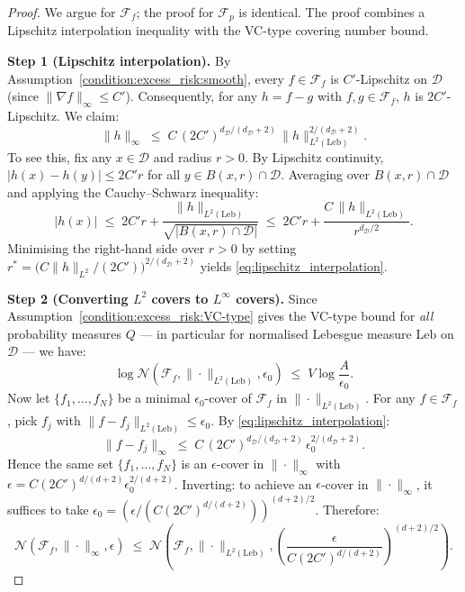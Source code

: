 \begin{proof}
We argue for $\mathcal{F}_f$; the proof for $\mathcal{F}_p$ is identical. The proof combines a Lipschitz interpolation inequality with the VC-type covering number bound.

\noindent\textbf{Step 1 (Lipschitz interpolation).}
By Assumption~\ref{condition:excess_risk:smooth}, every $f\in\mathcal{F}_f$ is $C'$-Lipschitz on $\mathcal{D}$ (since $\|\nabla f\|_\infty\leq C'$). Consequently, for any $h = f-g$ with $f,g\in\mathcal{F}_f$, $h$ is $2C'$-Lipschitz. We claim:
\begin{equation}\label{eq:lipschitz_interpolation}
\|h\|_\infty \;\leq\; C\,(2C')^{d_{\mathcal{D}}/(d_{\mathcal{D}}+2)}\,\|h\|_{L^2(\mathrm{Leb})}^{2/(d_{\mathcal{D}}+2)}.
\end{equation}
To see this, fix any $x\in\mathcal{D}$ and radius $r>0$. By Lipschitz continuity, $|h(x)-h(y)|\leq 2C' r$ for all $y\in B(x,r)\cap\mathcal{D}$. Averaging over $B(x,r)\cap\mathcal{D}$ and applying the Cauchy--Schwarz inequality:
\[
|h(x)| \;\leq\; 2C' r + \frac{\|h\|_{L^2(\mathrm{Leb})}}{\sqrt{|B(x,r)\cap\mathcal{D}|}}
\;\leq\; 2C' r + \frac{C\,\|h\|_{L^2(\mathrm{Leb})}}{r^{d_{\mathcal{D}}/2}}.
\]
Minimising the right-hand side over $r>0$ by setting $r^* = \bigl(C\|h\|_{L^2}/(2C')\bigr)^{2/(d_{\mathcal{D}}+2)}$ yields \eqref{eq:lipschitz_interpolation}.

\noindent\textbf{Step 2 (Converting $L^2$ covers to $L^\infty$ covers).}
Since Assumption~\ref{condition:excess_risk:VC-type} gives the VC-type bound for \emph{all} probability measures $Q$ — in particular for normalised Lebesgue measure $\mathrm{Leb}$ on $\mathcal{D}$ — we have:
\[
\log\mathcal{N}(\mathcal{F}_f,\|\cdot\|_{L^2(\mathrm{Leb})},\epsilon_0) \;\leq\; V\log\frac{A}{\epsilon_0}.
\]
Now let $\{f_1,\ldots,f_N\}$ be a minimal $\epsilon_0$-cover of $\mathcal{F}_f$ in $\|\cdot\|_{L^2(\mathrm{Leb})}$. For any $f\in\mathcal{F}_f$, pick $f_j$ with $\|f-f_j\|_{L^2(\mathrm{Leb})}\leq\epsilon_0$. By \eqref{eq:lipschitz_interpolation}:
\[
\|f-f_j\|_\infty \;\leq\; C\,(2C')^{d_{\mathcal{D}}/(d_{\mathcal{D}}+2)}\,\epsilon_0^{2/(d_{\mathcal{D}}+2)}.
\]
Hence the same set $\{f_1,\ldots,f_N\}$ is an $\epsilon$-cover in $\|\cdot\|_\infty$ with $\epsilon = C(2C')^{d/(d+2)}\epsilon_0^{2/(d+2)}$. Inverting: to achieve an $\epsilon$-cover in $\|\cdot\|_\infty$, it suffices to take $\epsilon_0 = (\epsilon/(C(2C')^{d/(d+2)}))^{(d+2)/2}$. Therefore:
\[
\mathcal{N}(\mathcal{F}_f,\|\cdot\|_\infty,\epsilon) \;\leq\; \mathcal{N}\!\left(\mathcal{F}_f,\|\cdot\|_{L^2(\mathrm{Leb})},\left(\frac{\epsilon}{C(2C')^{d/(d+2)}}\right)^{(d+2)/2}\right).
\]


\end{proof}
